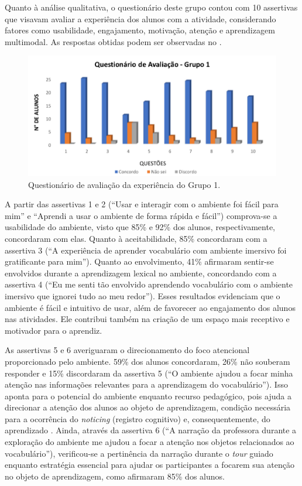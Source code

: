 Quanto à análise qualitativa, o questionário deste grupo contou com 10
assertivas que visavam avaliar a experiência dos alunos com a atividade,
considerando fatores como usabilidade, engajamento, motivação, atenção e
aprendizagem multimodal. As respostas obtidas podem ser observadas no
.

\begin{figure}[htpb]
    \centering
    \begin{minipage}{.75\textwidth}
    \includegraphics[width=\textwidth]{graph-02.png}
    \caption{Questionário de avaliação da experiência do Grupo 1.}
    \label{graph-02}
    \end{minipage}
\end{figure}

A partir das assertivas 1 e 2 (``Usar e interagir com o ambiente foi
fácil para mim'' e ``Aprendi a usar o ambiente de forma rápida e
fácil'') comprova-se a usabilidade do ambiente, visto que 85\% e 92\%
dos alunos, respectivamente, concordaram com elas. Quanto à
aceitabilidade, 85\% concordaram com a assertiva 3 (``A experiência de
aprender vocabulário com ambiente imersivo foi gratificante para mim'').
Quanto ao envolvimento, 41\% afirmaram sentir-se envolvidos durante a
aprendizagem lexical no ambiente, concordando com a assertiva 4 (``Eu me
senti tão envolvido aprendendo vocabulário com o ambiente imersivo que
ignorei tudo ao meu redor''). Esses resultados evidenciam que o ambiente
é fácil e intuitivo de usar, além de favorecer ao engajamento dos alunos
nas atividades. Ele contribui também na criação de um espaço mais
receptivo e motivador para o aprendiz.

As assertivas 5 e 6 averiguaram o direcionamento do foco atencional
proporcionado pelo ambiente. 59\% dos alunos concordaram, 26\% não
souberam responder e 15\% discordaram da assertiva 5 (``O ambiente
ajudou a focar minha atenção nas informações relevantes para a
aprendizagem do vocabulário''). Isso aponta para o potencial do ambiente
enquanto recurso pedagógico, pois ajuda a direcionar a atenção dos
alunos ao objeto de aprendizagem, condição necessária para a ocorrência
do \emph{noticing} (registro cognitivo) e, consequentemente, do
aprendizado \cite{schmidit1990}. Ainda, através da assertiva 6 (``A narração
da professora durante a exploração do ambiente me ajudou a focar a
atenção nos objetos relacionados ao vocabulário''), verificou-se a
pertinência da narração durante o \emph{tour} guiado enquanto estratégia
essencial para ajudar os participantes a focarem sua atenção no objeto
de aprendizagem, como afirmaram 85\% dos alunos.

